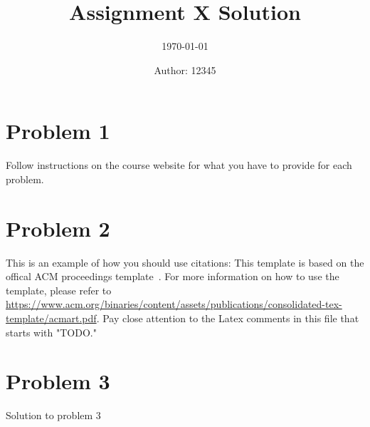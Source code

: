 \documentclass[manuscript, nonacm]{acmart}
\title[CPEN442: Introdution to Computer Security - Fall 2020]{Assignment X Solution}
\subtitle{\today}
\author{Author: 12345}
\begin{document}
\maketitle
\thispagestyle{fancy}

\section{Problem 1}
Follow instructions on the course website for what you have to provide for each problem. 

\section{Problem 2}
This is an example of how you should use citations: This template is based on the offical ACM proceedings template~\cite{ACMTemplate}. For more information on how to use the template, please refer to \url{https://www.acm.org/binaries/content/assets/publications/consolidated-tex-template/acmart.pdf}. Pay close attention to the Latex comments in this file that starts with "TODO."

\section{Problem 3}
Solution to problem 3




\end{document}
